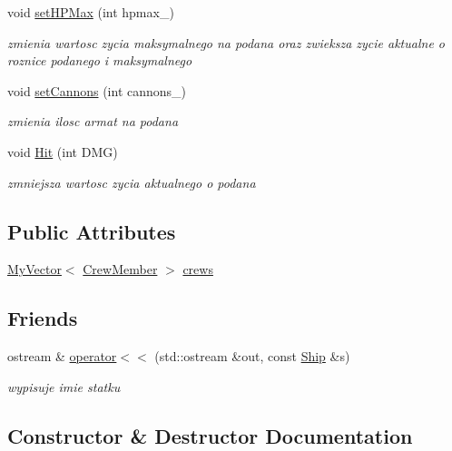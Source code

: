 \begin{DoxyCompactItemize}
void \hyperlink{class_ship_a90a24cf803f294ab17d0900379268fc2}{set\+H\+P\+Max} (int hpmax\+\_\+)
\begin{DoxyCompactList}\small\item\em zmienia wartosc zycia maksymalnego na podana oraz zwieksza zycie aktualne o roznice podanego i maksymalnego \end{DoxyCompactList}\item 
void \hyperlink{class_ship_ab3b9f082db652dd440736dc79a4ed507}{set\+Cannons} (int cannons\+\_\+)
\begin{DoxyCompactList}\small\item\em zmienia ilosc armat na podana \end{DoxyCompactList}\item 
void \hyperlink{class_ship_a13d7e59a6e96c98b342dd97473f71c38}{Hit} (int D\+MG)
\begin{DoxyCompactList}\small\item\em zmniejsza wartosc zycia aktualnego o podana \end{DoxyCompactList}\end{DoxyCompactItemize}
\subsection*{Public Attributes}
\begin{DoxyCompactItemize}
\item 
\hyperlink{class_my_vector}{My\+Vector}$<$ \hyperlink{class_crew_member}{Crew\+Member} $>$ \hyperlink{class_ship_a24150015bbbbf80f26f8384e93781600}{crews}
\end{DoxyCompactItemize}
\subsection*{Friends}
\begin{DoxyCompactItemize}
\item 
ostream \& \hyperlink{class_ship_a9c719ebfe58cebdabd53ebc0f6c16627}{operator$<$$<$} (std\+::ostream \&out, const \hyperlink{class_ship}{Ship} \&s)
\begin{DoxyCompactList}\small\item\em wypisuje imie statku \end{DoxyCompactList}\end{DoxyCompactItemize}


\subsection{Constructor \& Destructor Documentation}
\mbox{\label{class_ship_a53f9329606690e48ed1ff3543fa4ae3e}} 
